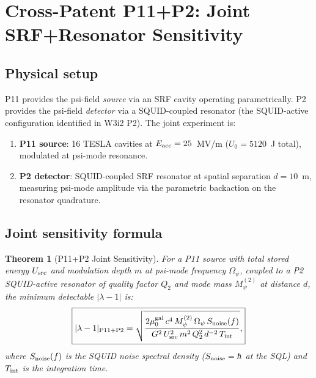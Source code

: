 \documentclass[11pt,twocolumn]{article}
\newcommand{\lam}{\lambda}
\newcommand{\Opsi}{\Omega_\psi}
\newcommand{\Mpsi}{M_\psi}
\newtheorem{theorem}{Theorem}[section]
\begin{document}
\section{Cross-Patent P11+P2: Joint SRF+Resonator Sensitivity}
\label{sec:joint_p11p2}

\subsection{Physical setup}

P11 provides the psi-field \emph{source} via an SRF cavity operating
parametrically. P2 provides the psi-field \emph{detector} via a
SQUID-coupled resonator (the SQUID-active configuration identified in
W3i2 P2). The joint experiment is:
\begin{enumerate}[nosep]
\item \textbf{P11 source}: 16 TESLA cavities at $E_{\rm acc} = 25$~MV/m
  ($U_0 = 5120$~J total), modulated at psi-mode resonance.
\item \textbf{P2 detector}: SQUID-coupled SRF resonator at spatial
  separation $d = 10$~m, measuring psi-mode amplitude via
  the parametric backaction on the resonator quadrature.
\end{enumerate}

\subsection{Joint sensitivity formula}

\begin{theorem}[P11+P2 Joint Sensitivity]
\label{thm:joint_p11p2}
For a P11 source with total stored energy $U_{\rm src}$ and modulation
depth $m$ at psi-mode frequency $\Opsi$, coupled to a P2 SQUID-active
resonator of quality factor $Q_2$ and mode mass $\Mpsi^{(2)}$ at
distance $d$, the minimum detectable $|\lam-1|$ is:
\begin{equation}
\boxed{
|\lam-1|_{\rm P11+P2} = \sqrt{
\frac{2\mu_0^{\rm gal}\,c^4\,\Mpsi^{(2)}\,\Opsi\,S_{\rm noise}(f)}
{G^2\,U_{\rm src}^2\,m^2\,Q_2^2\,d^{-2}\,T_{\rm int}}
},
}
\label{eq:joint_sensitivity}
\end{equation}
where $S_{\rm noise}(f)$ is the SQUID noise spectral density
($S_{\rm noise} = \hbar$ at the SQL) and $T_{\rm int}$ is the
integration time.
\end{theorem}
\end{document}
